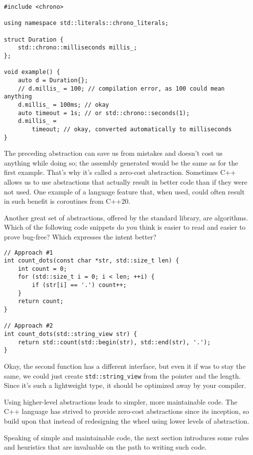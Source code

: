 \begin{lstlisting}[style=styleCXX]
#include <chrono>

using namespace std::literals::chrono_literals;

struct Duration {
	std::chrono::milliseconds millis_;
};

void example() {
	auto d = Duration{};
	// d.millis_ = 100; // compilation error, as 100 could mean anything
	d.millis_ = 100ms; // okay
	auto timeout = 1s; // or std::chrono::seconds(1);
	d.millis_ =
		timeout; // okay, converted automatically to milliseconds
}

\end{lstlisting}

The preceding abstraction can save us from mistakes and doesn't cost us anything while doing so; the assembly generated would be the same as for the first example. That's why it's called a zero-cost abstraction. Sometimes C++ allows us to use abstractions that actually result in better code than if they were not used. One example of a language feature that, when used, could often result in such benefit is coroutines from C++20.

Another great set of abstractions, offered by the standard library, are algorithms. Which of the following code snippets do you think is easier to read and easier to prove bug-free? Which expresses the intent better?


\begin{lstlisting}[style=styleCXX]
// Approach #1
int count_dots(const char *str, std::size_t len) {
	int count = 0;
	for (std::size_t i = 0; i < len; ++i) {
		if (str[i] == '.') count++;
	}
	return count;
}

// Approach #2
int count_dots(std::string_view str) {
	return std::count(std::begin(str), std::end(str), '.');
}

\end{lstlisting}

Okay, the second function has a different interface, but even it if was to stay the same, we could just create \texttt{std::string\_view} from the pointer and the length. Since it's such a lightweight type, it should be optimized away by your compiler.

Using higher-level abstractions leads to simpler, more maintainable code. The C++ language has strived to provide zero-cost abstractions since its inception, so build upon that instead of redesigning the wheel using lower levels of abstraction.

Speaking of simple and maintainable code, the next section introduces some rules and heuristics that are invaluable on the path to writing such code.















